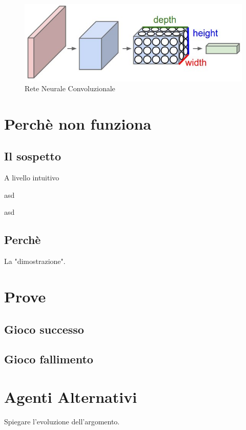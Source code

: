\documentclass[twoside,twocolumn,10pt]{extarticle}
\theoremstyle{definition}
\begin{document}
\begin{figure}[h]
	\centering
	\includegraphics[scale=.4]{images/cnn.jpeg}
	\caption{Rete Neurale Convoluzionale}
	\label{fig:cnn}
\end{figure}

\section{Perchè non funziona}\label{}
	\subsection{Il sospetto}
		A livello intuitivo
		\begin{table}[h]
			\centering
			\caption{asd}
			
			\label{tab:gerarchia}
		\end{table}
		\begin{table}[h]
			\centering
			\caption{asd}
			\label{tab:pgm}
			
		\end{table}
	
	
	\subsection{Perchè}
		La "dimostrazione".
		
\section{Prove}
	\subsection{Gioco successo}
	
	\subsection{Gioco fallimento}
		
\section{Agenti Alternativi}\label{}
	Spiegare l'evoluzione dell'argomento.
\end{document}
